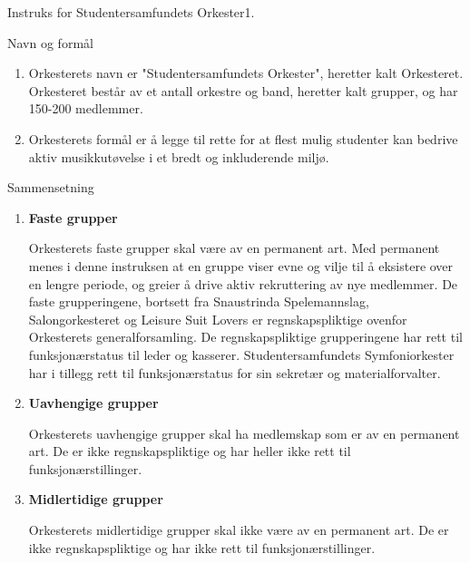 
\begin{instruks}{Instruks for Studentersamfundets Orkester}{1. }{ }

    \begin{instruksledd}{Navn og formål}
        \begin{enumerate}
            \item Orkesterets navn er "Studentersamfundets Orkester", heretter kalt Orkesteret.
                Orkesteret består av et antall
                orkestre og band, heretter kalt grupper, og har 150-200 medlemmer.
            \item Orkesterets formål er å legge til rette for at flest mulig studenter kan bedrive aktiv
                musikkutøvelse i et bredt
                og inkluderende miljø.
        \end{enumerate}
    \end{instruksledd}

    \begin{instruksledd}{Sammensetning}
        \begin{enumerate}

            \item \textbf{Faste grupper}

                Orkesterets faste grupper skal være av en permanent art. Med permanent menes i denne
                instruksen at en
                gruppe viser evne og vilje til å eksistere over en lengre periode, og greier å drive aktiv
                rekruttering av nye
                medlemmer. De faste grupperingene, bortsett fra Snaustrinda Spelemannslag, Salongorkesteret og
                Leisure
                Suit Lovers er regnskapspliktige ovenfor Orkesterets generalforsamling. De regnskapspliktige
                grupperingene
                har rett til funksjonærstatus til leder og kasserer. Studentersamfundets Symfoniorkester har i
                tillegg rett til
                funksjonærstatus for sin sekretær og materialforvalter.

            \item \textbf{Uavhengige grupper}

                Orkesterets uavhengige grupper skal ha medlemskap som er av en permanent art. De er ikke
                regnskapspliktige og har heller ikke rett til funksjonærstillinger.

            \item \textbf{Midlertidige grupper}

                Orkesterets midlertidige grupper skal ikke være av en permanent art. De er ikke
                regnskapspliktige og har
                ikke rett til funksjonærstillinger.


\end{enumerate}
\end{instruksledd}
\end{instruks}
